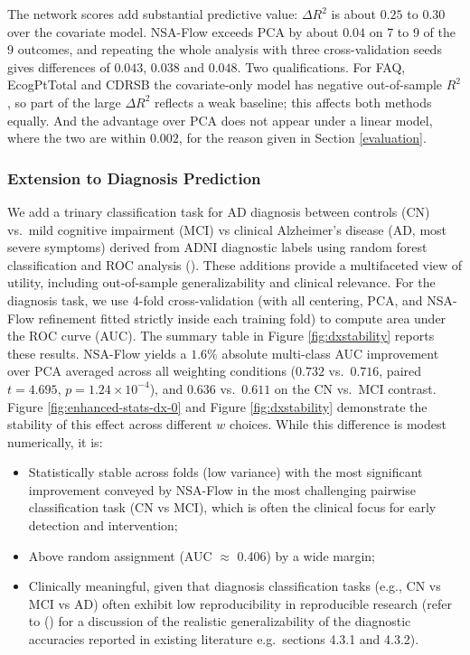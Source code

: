 \documentclass[
]{article}
\begin{document}
The network scores add substantial predictive value: \(\Delta R^2\) is about
\(0.25\) to \(0.30\) over the covariate model. NSA-Flow exceeds PCA by about
\(0.04\) on 7 to 9 of the 9 outcomes, and repeating the whole analysis with
three cross-validation seeds gives differences of \(0.043\), \(0.038\) and
\(0.048\). Two qualifications. For FAQ, EcogPtTotal and CDRSB the covariate-only
model has negative out-of-sample \(R^2\), so part of the large \(\Delta R^2\)
reflects a weak baseline; this affects both methods equally. And the advantage
over PCA does not appear under a linear model, where the two are within
\(0.002\), for the reason given in Section \ref{evaluation}.

\subsubsection{Extension to Diagnosis Prediction}\label{extension-to-diagnosis-prediction}

We add a trinary classification task for AD diagnosis between controls (CN) vs.~mild cognitive impairment (MCI) vs clinical Alzheimer's disease (AD, most severe symptoms) derived from ADNI diagnostic labels using random forest classification and ROC analysis (). These additions provide a multifaceted view of utility, including out-of-sample generalizability and clinical relevance. For the diagnosis task, we use 4-fold cross-validation (with all centering, PCA, and NSA-Flow refinement fitted strictly inside each training fold) to compute area under the ROC curve (AUC). The summary table in Figure \ref{fig:dxstability} reports these results. NSA-Flow yields a \(1.6\%\) absolute multi-class AUC improvement over PCA averaged across all weighting conditions (\(0.732\) vs.~\(0.716\), paired \(t = 4.695\), \(p = 1.24 \times 10^{-4}\)), and \(0.636\) vs.~\(0.611\) on the CN vs.~MCI contrast. Figure \ref{fig:enhanced-stats-dx-0} and Figure \ref{fig:dxstability} demonstrate the stability of this effect across different \(w\) choices. While this difference is modest numerically, it is:

\begin{itemize}
\item
  Statistically stable across folds (low variance) with the most significant improvement conveyed by NSA-Flow in the most challenging pairwise classification task (CN vs MCI), which is often the clinical focus for early detection and intervention;
\item
  Above random assignment (AUC \(\approx\) 0.406) by a wide margin;
\item
  Clinically meaningful, given that diagnosis classification tasks (e.g., CN vs MCI vs AD) often exhibit low reproducibility in reproducible research (refer to () for a discussion of the realistic generalizability of the diagnostic accuracies reported in existing literature e.g.~sections 4.3.1 and 4.3.2).
\end{itemize}
\end{document}
